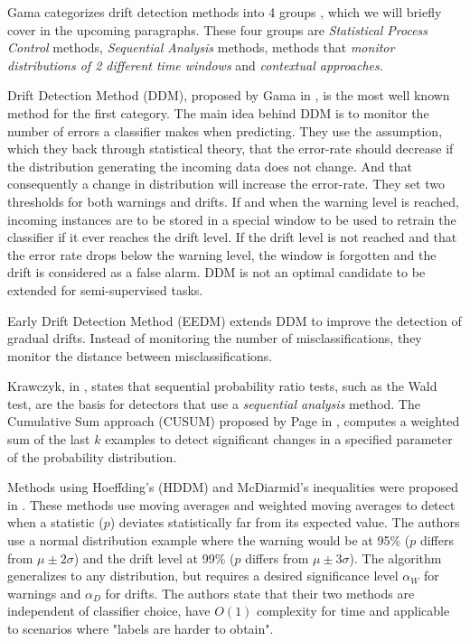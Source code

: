 Gama categorizes drift detection methods into 4 groups \cite{Gama:2014:SCD:2597757.2523813}, which we will briefly cover in the upcoming paragraphs. These four groups are \textit{Statistical Process Control} methods, \textit{Sequential Analysis} methods, methods that \textit{monitor distributions of 2 different time windows} and \textit{contextual approaches}.

Drift Detection Method (DDM), proposed by Gama in \cite{gama2004learning}, is the most well known method for the first category. The main idea behind DDM is to monitor the number of errors a classifier makes when predicting. They use the assumption, which they back through statistical theory, that the error-rate should decrease if the distribution generating the incoming data does not change. And that consequently a change in distribution will increase the error-rate. They set two thresholds for both warnings and drifts. If and when the warning level is reached, incoming instances are to be stored in a special window to be used to retrain the classifier if it ever reaches the drift level. If the drift level is not reached and that the error rate drops below the warning level, the window is forgotten and the drift is considered as a false alarm. DDM is not an optimal candidate to be extended for semi-supervised tasks.

Early Drift Detection Method (EEDM) \cite{baena2006early} extends DDM to improve the detection of gradual drifts. Instead of monitoring the number of misclassifications, they monitor the distance between misclassifications.

Krawczyk, in \cite{KRAWCZYK2017132}, states that sequential probability ratio tests, such as the Wald test, are the basis for detectors that use a \textit{sequential analysis} method.
The Cumulative Sum approach (CUSUM) proposed by Page in \cite{page1954continuous}, computes a weighted sum of the last $k$ examples to detect significant changes in a specified parameter of the probability distribution.

Methods using Hoeffding's (HDDM) and McDiarmid's inequalities were proposed in \cite{frias2015online}. These methods use moving averages and weighted moving averages to detect when a statistic ($p$) deviates statistically far from its expected value. The authors use a normal distribution example where the warning would be at 95\% ($p$ differs from $\mu\pm 2\sigma$) and the drift level at 99\% ($p$ differs from $\mu\pm 3\sigma$). The algorithm generalizes to any distribution, but requires a desired significance level $\alpha_W$ for warnings and $\alpha_D$ for drifts. The authors state that their two methods are independent of classifier choice, have $O(1)$ complexity for time and applicable to scenarios where "labels are harder to obtain". 

